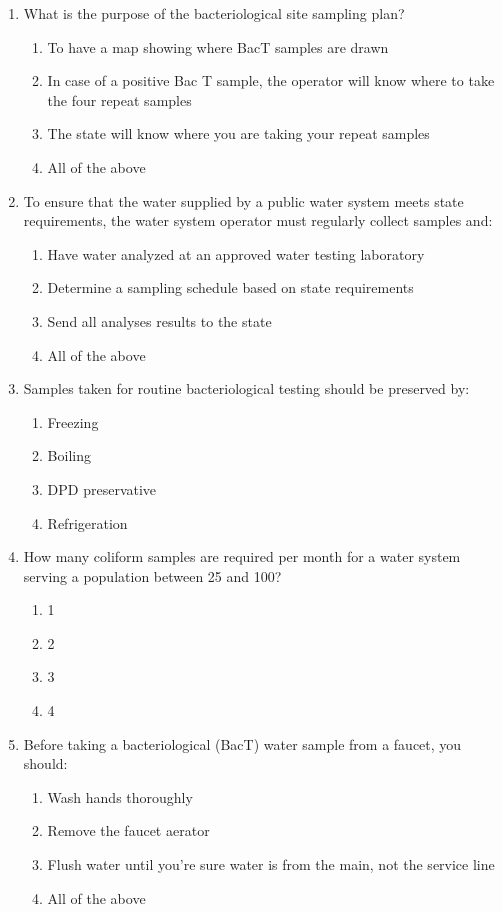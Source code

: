 \begin{enumerate}[1.]
\item What is the purpose of the bacteriological site sampling plan?
\begin{enumerate}
\item To have a map showing where BacT samples are drawn
\item In case of a positive Bac T sample, the operator will know where to take the
four repeat samples
\item The state will know where you are taking your repeat samples
\item All of the above
\end{enumerate}
\item To ensure that the water supplied by a public water system meets state requirements, the water system operator must regularly collect samples and:
\begin{enumerate}
\item Have water analyzed at an approved water testing laboratory
\item Determine a sampling schedule based on state requirements
\item Send all analyses results to the state
\item All of the above
\end{enumerate}
\item Samples taken for routine bacteriological testing should be preserved by:
\begin{enumerate}
\item Freezing
\item Boiling
\item DPD preservative
\item Refrigeration
\end{enumerate}

\item How many coliform samples are required per month for a water system serving a population between 25 and 100?
\begin{enumerate}
\item 1
\item 2
\item 3
\item 4
\end{enumerate}

\item Before taking a bacteriological (BacT) water sample from a faucet, you should:
\begin{enumerate}
\item Wash hands thoroughly
\item Remove the faucet aerator
\item Flush water until you’re sure water is from the main, not the service line
\item All of the above
\end{enumerate}


\end{enumerate}
